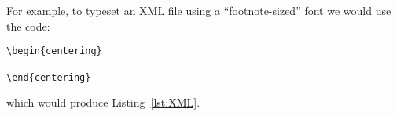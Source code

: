 For example, to typeset an XML file using a ``footnote-sized'' font we would
use the code:
\begin{verbatim}
\begin{centering}
    
\end{centering}
\end{verbatim}

\noindent which would produce Listing~\ref{lst:XML}.

\begin{centering}
    
\end{centering}



